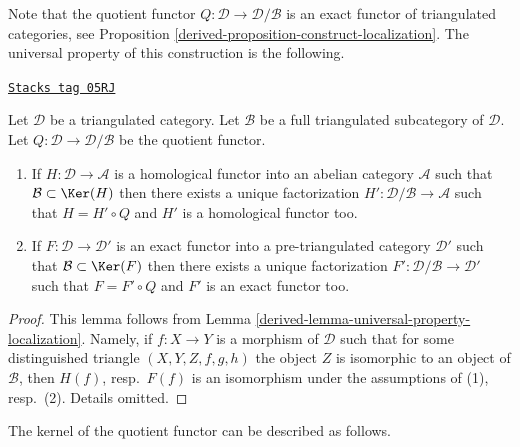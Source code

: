 Note that the quotient functor
$Q : \mathcal{D} \to \mathcal{D}/\mathcal{B}$
is an exact functor of triangulated categories, see
Proposition \ref{derived-proposition-construct-localization}.
The universal property of this construction is the following.

\begin{lemma}
\label{derived-lemma-universal-property-quotient}
\href{https://stacks.math.columbia.edu/tag/05RJ}{\texttt{Stacks tag 05RJ}}


Let $\mathcal{D}$ be a triangulated category. Let $\mathcal{B}$
be a full triangulated subcategory of $\mathcal{D}$. Let
$Q : \mathcal{D} \to \mathcal{D}/\mathcal{B}$ be the quotient functor.
\begin{enumerate}
\item If $H : \mathcal{D} \to \mathcal{A}$ is a homological functor into
an abelian category $\mathcal{A}$ such that
$\mathcal{B} \subset \Ker(H)$ then there exists a unique factorization
$H' : \mathcal{D}/\mathcal{B} \to \mathcal{A}$ such that $H = H' \circ Q$
and $H'$ is a homological functor too.
\item If $F : \mathcal{D} \to \mathcal{D}'$ is an exact functor into
a pre-triangulated category $\mathcal{D}'$ such that
$\mathcal{B} \subset \Ker(F)$ then there exists a unique factorization
$F' : \mathcal{D}/\mathcal{B} \to \mathcal{D}'$ such that $F = F' \circ Q$
and $F'$ is an exact functor too.
\end{enumerate}
\end{lemma}

\begin{proof}

This lemma follows from
Lemma \ref{derived-lemma-universal-property-localization}.
Namely, if $f : X \to Y$ is a morphism of $\mathcal{D}$
such that for some distinguished triangle $(X, Y, Z, f, g, h)$
the object $Z$ is isomorphic to an object of $\mathcal{B}$, then
$H(f)$, resp.\ $F(f)$ is an isomorphism under the assumptions of
(1), resp.\ (2). Details omitted.
\end{proof}

The kernel of the quotient functor can be described as follows.

